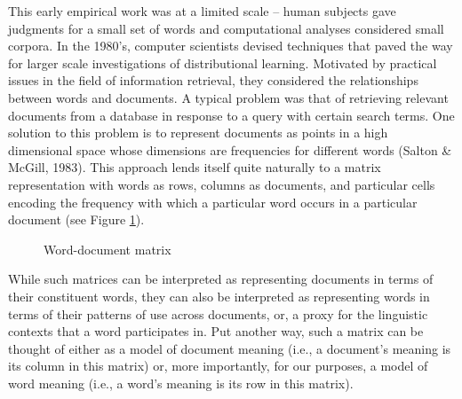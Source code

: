 \documentclass[man,floatsintext]{apa6}
\begin{document}
This early empirical work was at a limited scale -- human subjects
gave judgments for a small set of words and computational analyses
considered small corpora. In the 1980's, computer scientists devised
techniques that paved the way for larger scale investigations of
distributional learning. Motivated by practical issues in the field of
information retrieval, they considered the relationships between words
and documents. A typical problem was that of retrieving relevant
documents from a database in response to a query with certain search
terms. One solution to this problem is to represent documents as
points in a high dimensional space whose dimensions are frequencies
for different words (Salton \& McGill, 1983). This approach lends
itself quite naturally to a matrix representation with words as rows,
columns as documents, and particular cells encoding the frequency with
which a particular word occurs in a particular document (see Figure
\ref{matrix-word-doc}).

\begin{figure}
  \begin{center} \footnotesize{}
  \end{center}
  \caption{Word-document matrix}
  \label{matrix-word-doc}
\end{figure}

While such matrices can be interpreted as representing documents in
terms of their constituent words, they can also be interpreted as
representing words in terms of their patterns of use across documents,
or, a proxy for the linguistic contexts that a word participates
in. Put another way, such a matrix can be thought of either as a model
of document meaning (i.e., a document's meaning is its column in this
matrix) or, more importantly, for our purposes, a model of word
meaning (i.e., a word's meaning is its row in this matrix).
\end{document}
